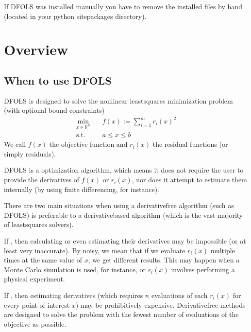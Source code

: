 \documentclass[letterpaper,10pt,english]{sphinxmanual}
\begin{document}
If DFO\sphinxhyphen{}LS was installed manually you have to remove the installed files by hand (located in your python site\sphinxhyphen{}packages directory).


\chapter{Overview}
\label{\detokenize{info:overview}}\label{\detokenize{info::doc}}

\section{When to use DFO\sphinxhyphen{}LS}
\label{\detokenize{info:when-to-use-dfo-ls}}
DFO\sphinxhyphen{}LS is designed to solve the nonlinear least\sphinxhyphen{}squares minimization problem (with optional bound constraints)
\begin{equation*}
\begin{split}\min_{x\in\mathbb{R}^n}  &\quad  f(x) := \sum_{i=1}^{m}r_{i}(x)^2 \\
\text{s.t.} &\quad  a \leq x \leq b\end{split}
\end{equation*}
We call \(f(x)\) the objective function and \(r_i(x)\) the residual functions (or simply residuals).

DFO\sphinxhyphen{}LS is a  optimization algorithm, which means it does not require the user to provide the derivatives of \(f(x)\) or \(r_i(x)\), nor does it attempt to estimate them internally (by using finite differencing, for instance).

There are two main situations when using a derivative\sphinxhyphen{}free algorithm (such as DFO\sphinxhyphen{}LS) is preferable to a derivative\sphinxhyphen{}based algorithm (which is the vast majority of least\sphinxhyphen{}squares solvers).

If , then calculating or even estimating their derivatives may be impossible (or at least very inaccurate). By noisy, we mean that if we evaluate \(r_i(x)\) multiple times at the same value of \(x\), we get different results. This may happen when a Monte Carlo simulation is used, for instance, or \(r_i(x)\) involves performing a physical experiment.

If , then estimating derivatives (which requires \(n\) evaluations of each \(r_i(x)\) for every point of interest \(x\)) may be prohibitively expensive. Derivative\sphinxhyphen{}free methods are designed to solve the problem with the fewest number of evaluations of the objective as possible.
\end{document}
